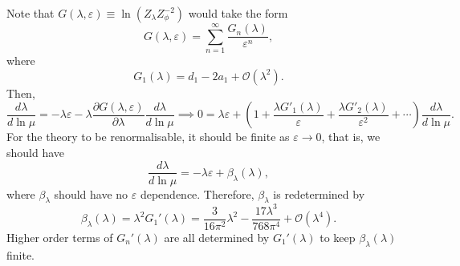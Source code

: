 \begin{solution}
     Note that $G(\lambda,\varepsilon) \equiv\ln (Z_\lambda Z_\phi^{-2})$ would take the form
     \begin{equation}
         G(\lambda,\varepsilon) = \sum_{n=1}^\infty\frac{G_n(\lambda)}{\varepsilon^n},
     \end{equation}
     where 
     \begin{equation}
         G_1(\lambda) = d_1 - 2a_1 + \mathcal{O}(\lambda^2).   
    \end{equation}
    Then,
    \begin{equation}
        \frac{d\lambda}{d\ln\mu} = -\lambda\varepsilon-\lambda\frac{\partial G(\lambda,\varepsilon)}{\partial \lambda}\frac{d\lambda}{d\ln\mu} \implies 0 = \lambda\varepsilon+\left(1+\frac{\lambda G'_1(\lambda)}{\varepsilon} + \frac{\lambda G'_2(\lambda)}{\varepsilon^2}+\cdots\right)\frac{d\lambda}{d\ln\mu}.
    \end{equation}
    For the theory to be renormalisable, it should be finite as $\varepsilon\to0$, that is, we should have
    \begin{equation}
        \frac{d\lambda}{d\ln\mu} = -\lambda\varepsilon + \beta_\lambda(\lambda),
    \end{equation}
    where $\beta_\lambda$ should have no $\varepsilon$ dependence. Therefore, $\beta_\lambda$ is redetermined by
    \begin{equation}
        \beta_\lambda(\lambda) = \lambda^2 G_1'(\lambda) = \frac{3}{16\pi^2}\lambda^2 - \frac{17\lambda^3}{768\pi^4} + \mathcal{O}(\lambda^4).
    \end{equation}
    Higher order terms of $G_n'(\lambda)$ are all determined by $G_1'(\lambda)$ to keep $\beta_\lambda(\lambda)$ finite.
    

\end{solution}

